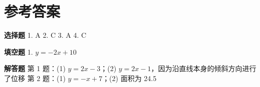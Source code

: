 \documentclass{exam-zh}
\begin{document}
\clearpage
\section*{参考答案}


\begin{keyideabox}
  \textbf{选择题}
  1. A  2. C  3. A  4. C
\end{keyideabox}



\begin{keyideabox}
  \textbf{填空题}
  1. $y = -2x + 10$
\end{keyideabox}



\begin{keyideabox}
  \textbf{解答题}
  第 1 题：(1) $y = 2x - 3$；(2) $y = 2x - 1$，因为沿直线本身的倾斜方向进行了位移
第 2 题：(1) $y = -x + 7$；(2) 面积为 24.5
\end{keyideabox}
\end{document}
